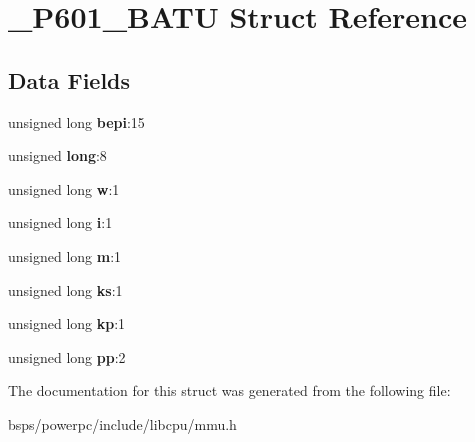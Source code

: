 \hypertarget{struct__P601__BATU}{}\section{\+\_\+\+P601\+\_\+\+B\+A\+TU Struct Reference}
\label{struct__P601__BATU}
\subsection*{Data Fields}
\begin{DoxyCompactItemize}
\item 
\mbox{\label{struct__P601__BATU_ae25a7853e6eff2f19e520eaea3aaf848}} 
unsigned long {\bfseries bepi}\+:15
\item 
\mbox{\label{struct__P601__BATU_aac5bdeda7ded5b7c6801ab2f59b23a68}} 
unsigned {\bfseries long}\+:8
\item 
\mbox{\label{struct__P601__BATU_a9e82d335ff0cb8282e02a50733e75305}} 
unsigned long {\bfseries w}\+:1
\item 
\mbox{\label{struct__P601__BATU_a92d7e81675209dc78842cf4d0de82f9e}} 
unsigned long {\bfseries i}\+:1
\item 
\mbox{\label{struct__P601__BATU_a73bd4e159fbfd37d7fc3bcde4db832f0}} 
unsigned long {\bfseries m}\+:1
\item 
\mbox{\label{struct__P601__BATU_a7f5baa7dd0d2d1de025685764c11f10f}} 
unsigned long {\bfseries ks}\+:1
\item 
\mbox{\label{struct__P601__BATU_a403ff031f747db60ee6841fe6bc21b10}} 
unsigned long {\bfseries kp}\+:1
\item 
\mbox{\label{struct__P601__BATU_a26ecbd83579c05631f96bbb6895c6731}} 
unsigned long {\bfseries pp}\+:2
\end{DoxyCompactItemize}


The documentation for this struct was generated from the following file\+:\begin{DoxyCompactItemize}
\item 
bsps/powerpc/include/libcpu/mmu.\+h\end{DoxyCompactItemize}
